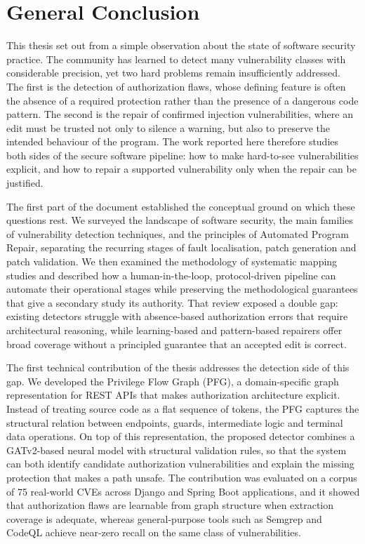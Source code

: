 \chapter*{General Conclusion}
\label{chap:conclusion}


This thesis set out from a simple observation about the state of software
security practice. The community has learned to detect many vulnerability
classes with considerable precision, yet two hard problems remain
insufficiently addressed. The first is the detection of authorization flaws,
whose defining feature is often the absence of a required protection rather
than the presence of a dangerous code pattern. The second is the repair of
confirmed injection vulnerabilities, where an edit must be trusted not only
to silence a warning, but also to preserve the intended behaviour of the
program. The work reported here therefore studies both sides of the secure
software pipeline: how to make hard-to-see vulnerabilities explicit, and how
to repair a supported vulnerability only when the repair can be justified.

The first part of the document established the conceptual ground on which
these questions rest. We surveyed the landscape of software security, the
main families of vulnerability detection techniques, and the principles of
Automated Program Repair, separating the recurring stages of fault
localisation, patch generation and patch validation. We then examined the
methodology of systematic mapping studies and described how a
human-in-the-loop, protocol-driven pipeline can automate their operational
stages while preserving the methodological guarantees that give a secondary
study its authority. That review exposed a double gap: existing detectors
struggle with absence-based authorization errors that require architectural
reasoning, while learning-based and pattern-based repairers offer broad
coverage without a principled guarantee that an accepted edit is correct.

The first technical contribution of the thesis addresses the detection side
of this gap. We developed the Privilege Flow Graph (PFG), a domain-specific
graph representation for REST APIs that makes authorization architecture
explicit. Instead of treating source code as a flat sequence of tokens, the
PFG captures the structural relation between endpoints, guards,
intermediate logic and terminal data operations. On top of this
representation, the proposed detector combines a GATv2-based neural model
with structural validation rules, so that the system can both identify
candidate authorization vulnerabilities and explain the missing protection
that makes a path unsafe. The contribution was evaluated on a corpus of
75 real-world CVEs across Django and Spring Boot applications, and it showed
that authorization flaws are learnable from graph structure when extraction
coverage is adequate, whereas general-purpose tools such as Semgrep and
CodeQL achieve near-zero recall on the same class of vulnerabilities.

